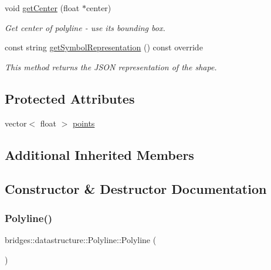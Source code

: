 \begin{DoxyCompactItemize}
void \hyperlink{classbridges_1_1datastructure_1_1_polyline_ad0783deb77873eda19528681bbbca25c}{get\+Center} (float $\ast$center)
\begin{DoxyCompactList}\small\item\em Get center of polyline -\/ use its bounding box. \end{DoxyCompactList}\item 
const string \hyperlink{classbridges_1_1datastructure_1_1_polyline_ab78c7200a23cdd652fd5a9722ac4526d}{get\+Symbol\+Representation} () const override
\begin{DoxyCompactList}\small\item\em This method returns the J\+S\+ON representation of the shape. \end{DoxyCompactList}\end{DoxyCompactItemize}
\subsection*{Protected Attributes}
\begin{DoxyCompactItemize}
\item 
vector$<$ float $>$ \hyperlink{classbridges_1_1datastructure_1_1_polyline_a0df21b6c3cc82930a93a495de5affda7}{points}
\end{DoxyCompactItemize}
\subsection*{Additional Inherited Members}


\subsection{Constructor \& Destructor Documentation}
\mbox{\label{classbridges_1_1datastructure_1_1_polyline_a488f6612485fc66534035c3574281a11}} 
\subsubsection{\texorpdfstring{Polyline()}{Polyline()}\hspace{0.1cm}{\footnotesize\ttfamily [1/2]}}
{\footnotesize\ttfamily bridges\+::datastructure\+::\+Polyline\+::\+Polyline (\begin{DoxyParamCaption}{ }\end{DoxyParamCaption})\hspace{0.3cm}{\ttfamily [inline]}}



